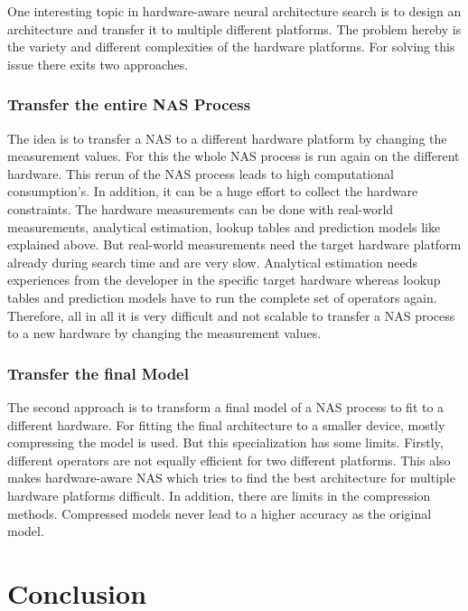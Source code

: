 \documentclass[conference]{IEEEtran}
\begin{document}
One interesting topic in hardware-aware neural architecture search is to design an architecture and transfer it to multiple different platforms. The problem hereby is the variety and different complexities of the hardware platforms. For solving this issue there exits two approaches.

\subsubsection{Transfer the entire NAS Process}

The idea is to transfer a NAS to a different hardware platform by changing the measurement values. For this the whole NAS process is run again on the different hardware. This rerun of the NAS process leads to high computational consumption's. In addition, it can be a huge effort to collect the hardware constraints. The hardware measurements can be done with real-world measurements, analytical estimation, lookup tables and prediction models like explained above. But real-world measurements need the target hardware platform already during search time and are very slow. Analytical estimation needs experiences from the developer in the specific target hardware whereas lookup tables and prediction models have to run the complete set of operators again. Therefore, all in all it is very difficult and not scalable to transfer a NAS process to a new hardware by changing the measurement values. 

\subsubsection{Transfer the final Model}

The second approach is to transform a final model of a NAS process to fit to a different hardware. For fitting the final architecture to a smaller device, mostly compressing the model is used. But this specialization has some limits. Firstly, different operators are not equally efficient for two different platforms. This also makes hardware-aware NAS which tries to find the best architecture for multiple hardware platforms difficult. In addition, there are limits in the compression methods. Compressed models never lead to a higher accuracy as the original model. 

\section{Conclusion}

\clearpage
\end{document}
